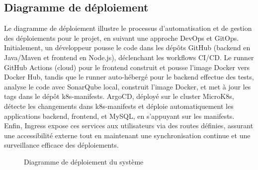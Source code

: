 \subsection{Diagramme de déploiement}
Le diagramme de déploiement illustre le processus d’automatisation et de gestion des déploiements pour le projet, en suivant une approche DevOps et GitOps. Initialement, un développeur pousse le code dans les dépôts GitHub (backend en Java/Maven et frontend en Node.js), déclenchant les workflows CI/CD. Le runner GitHub Actions (cloud) pour le frontend construit et pousse l’image Docker vers Docker Hub, tandis que le runner auto-hébergé pour le backend effectue des tests, analyse le code avec SonarQube local, construit l’image Docker, et met à jour les tags dans le dépôt k8s-manifests. ArgoCD, déployé sur le cluster MicroK8s, détecte les changements dans k8s-manifests et déploie automatiquement les applications backend, frontend, et MySQL, en s’appuyant sur les manifests. Enfin, Ingress expose ces services aux utilisateurs via des routes définies, assurant une accessibilité externe tout en maintenant une synchronisation continue et une surveillance efficace des déploiements.
\newpage
\begin{figure}[h]
      \centering
      \caption{Diagramme de déploiement du système}
      \label{fig:DeploymentDiagram}
  \end{figure}
